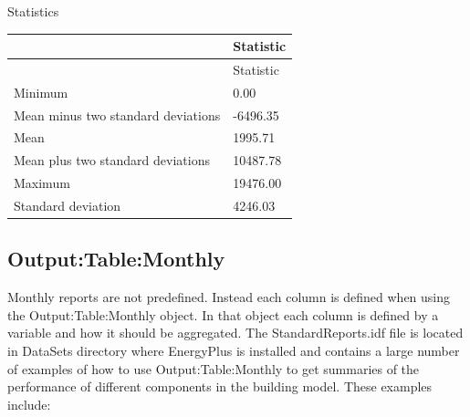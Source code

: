 Statistics

\begin{longtable}[c]{@{}ll@{}}
\toprule
~ & Statistic \tabularnewline
\midrule
\endfirsthead

\toprule
~ & Statistic \tabularnewline
\midrule
\endhead

Minimum & 0.00 \tabularnewline
Mean minus two standard deviations & -6496.35 \tabularnewline
Mean & 1995.71 \tabularnewline
Mean plus two standard deviations & 10487.78 \tabularnewline
Maximum & 19476.00 \tabularnewline
Standard deviation & 4246.03 \tabularnewline
\bottomrule
\end{longtable}

\subsection{Output:Table:Monthly}\label{outputtablemonthly}

Monthly reports are not predefined. Instead each column is defined when using the Output:Table:Monthly object. In that object each column is defined by a variable and how it should be aggregated. The StandardReports.idf file is located in DataSets directory where EnergyPlus is installed and contains a large number of examples of how to use Output:Table:Monthly to get summaries of the performance of different components in the building model. These examples include:

